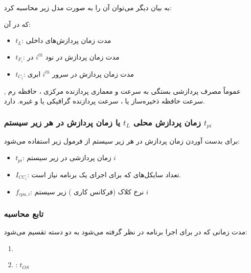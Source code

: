 \documentclass[a4paper]{article}
\begin{document}
به بیان دیگر می‌توان آن را به صورت مدل زیر محاسبه کرد:


که در آن:

\begin{itemize}
    \item $t_L$: مدت زمان پردازش‌های داخلی
    \item $t_{F_i}$: مدت زمان پردازش در نود $i^{th}$ در 
    \item $t_{C_i}$: مدت زمان پردازش در سرور $i^{th}$ ابری
\end{itemize}

عموماً مصرف پردازشی بستگی به سرعت و معماری پردازنده مرکزی ، حافظه رم
, سرعت حافظه ذخیره‌ساز  یا ، سرعت پردازنده گرافیکی
یا  و غیره. دارد.

\subsubsection{زمان پردازش محلی $t_L$ یا زمان پردازش در هر زیر سیستم $t_{pi}$}

برای بدست آوردن زمان پردازش در هر زیر سیستم از فرمول زیر استفاده می‌شود:


\begin{itemize}
    \item $t_{pi}$: زمان پردازشی در زیر سیستم $i$
    \item $I_{CC_i}$: تعداد سایکل‌های  که برای اجرای یک برنامه نیاز است.
    \item $f_{cpu, i}$: نرخ کلاک (فرکانس کاری ) زیر سیستم $i$
\end{itemize}


\subsubsection{تابع محاسبه }

مدت زمانی که در  برای اجرا برنامه در نظر گرفته می‌شود به دو دسته تقسیم می‌شود:

\begin{enumerate}
    \item {}
    \item {}: $t_{OS}$
\end{enumerate}
\end{document}
